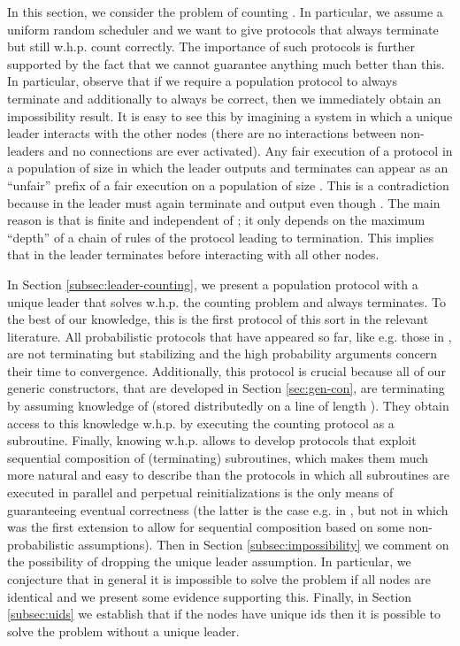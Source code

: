 \documentclass[oribibl, 11pt]{llncs}
\begin{document}
In this section, we consider the problem of counting . In particular, we assume a uniform random scheduler and we want to give protocols that always terminate but still w.h.p. count  correctly. The importance of such protocols is further supported by the fact that we cannot guarantee anything much better than this. In particular, observe that if we require a population protocol to always terminate and additionally to always be correct, then we immediately obtain an impossibility result. It is easy to see this by imagining a system in which a unique leader interacts with the other nodes (there are no interactions between non-leaders and no connections are ever activated). Any fair execution  of a protocol in a population of size  in which the leader outputs  and terminates can appear as an ``unfair'' prefix of a fair execution  on a population of size . This is a contradiction because in  the leader must again terminate and output  even though . The main reason is that  is finite and independent of ; it only depends on the maximum ``depth'' of a chain of rules of the protocol leading to termination. This implies that in  the leader terminates before interacting with all other nodes.

In Section \ref{subsec:leader-counting}, we present a population protocol with a unique leader that solves w.h.p. the counting problem and always terminates. To the best of our knowledge, this is the first protocol of this sort in the relevant literature. All probabilistic protocols that have appeared so far, like e.g. those in \cite{AADFP06,AAE08}, are not terminating but stabilizing and the high probability arguments concern their time to convergence. Additionally, this protocol is crucial because all of our generic constructors, that are developed in Section \ref{sec:gen-con}, are terminating by assuming knowledge of  (stored distributedly on a line of length ). They obtain access to this knowledge w.h.p. by executing the counting protocol as a subroutine. Finally, knowing  w.h.p. allows to develop protocols that exploit sequential composition of (terminating) subroutines, which makes them much more natural and easy to describe than the protocols in which all subroutines are executed in parallel and perpetual reinitializations is the only means of guaranteeing eventual correctness (the latter is the case e.g. in \cite{GR09,MCS11-2,MS14}, but not in \cite{MCS12c} which was the first extension to allow for sequential composition based on some non-probabilistic assumptions). Then in Section \ref{subsec:impossibility} we comment on the possibility of dropping the unique leader assumption. In particular, we conjecture that in general it is impossible to solve the problem if all nodes are identical and we present some evidence supporting this. Finally, in Section \ref{subsec:uids} we establish that if the nodes have unique ids then it is possible to solve the problem without a unique leader.  
\end{document}
